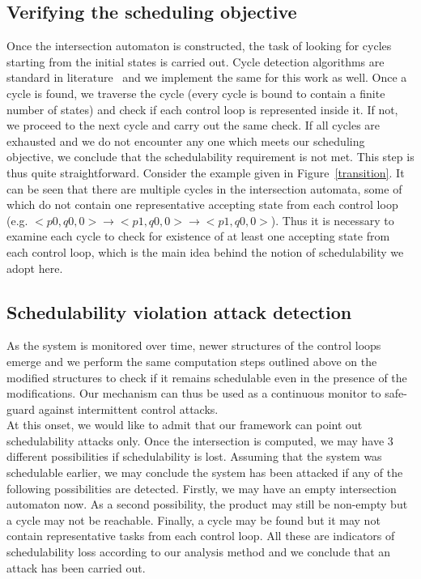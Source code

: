 \begin{figure}
\begin{center}
\end{center}
\label{fig:Algorithm}
\end{figure}

\subsection{Verifying the scheduling objective}
\noindent
Once the intersection automaton is constructed, the task of looking for cycles starting from the initial states is carried out. Cycle detection algorithms are standard in literature~\cite{Clarke:2000:MC:332656} and we implement the same for this work as well. Once a cycle is found, we traverse the cycle (every cycle is bound to contain a finite number of states) and check if each control loop is represented inside it. If not, we proceed to the next cycle and carry out the same check. If all cycles are exhausted and we do not encounter any one which meets our scheduling objective, we conclude that the schedulability requirement is not met. This step is thus quite straightforward. Consider the example given in Figure~\ref{transition}. It can be seen that there are multiple cycles in the intersection automata, some of which do not contain one representative accepting state from each control loop (e.g. $<p0,q0,0> \rightarrow <p1,q0,0> \rightarrow <p1,q0,0>$). Thus it is necessary to examine each cycle to check for existence of at least one accepting state from each control loop, which is the main idea behind the notion of schedulability we adopt here. 

\subsection{Schedulability violation attack detection}
\noindent
As the system is monitored over time, newer structures of the control loops emerge and we perform the same computation steps outlined above on the modified structures to check if it remains schedulable even in the presence of the modifications. Our mechanism can thus be used as a continuous monitor to safe-guard against intermittent control attacks. \\

\noindent
At this onset, we would like to admit that our framework can point out schedulability attacks only. Once the intersection is computed, we may have 3 different possibilities if schedulability is lost. Assuming that the system was schedulable earlier, we may conclude the system has been attacked if any of the following possibilities are detected. Firstly, we may have an empty intersection automaton now. As a second possibility, the product may still be non-empty but a cycle may not be reachable. Finally, a cycle may be found but it may not contain representative tasks from each control loop. All these are indicators of schedulability loss according to our analysis method and we conclude that an attack has been carried out.